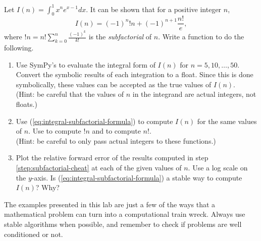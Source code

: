 \begin{problem}
Let $I(n) = \int_0^1 x^n e^{x - 1} dx$.
It can be shown that for a positive integer $n$,
\begin{equation}
I(n) = \left(-1\right)^{n} !n + \left(-1\right)^{n + 1} \frac{n!}{e},
\label{eq:integral-subfactorial-formula}
\end{equation}
where $!n=n!\sum_{k=0}^{n} \frac{(-1)^k}{k!}$ is the \emph{subfactorial} of $n$.
Write a function to do the following.
\begin{enumerate}
\item Use SymPy's  to evaluate the integral form of $I(n)$ for $n=5,10,\ldots,50$.
Convert the symbolic results of each integration to a float.
Since this is done symbolically, these values can be accepted as the true values of $I(n)$.
\\(Hint: be careful that the values of $n$ in the integrand are actual integers, not floats.)

\item Use (\ref{eq:integral-subfactorial-formula}) to compute $I(n)$ for the same values of $n$.
Use  to compute $!n$ and  to compute $n!$.
\\(Hint: be careful to only pass actual integers to these functions.)
\label{step:subfactorial-cheat}

\item Plot the relative forward error of the results computed in step \ref{step:subfactorial-cheat} at each of the given values of $n$.
Use a log scale on the $y$-axis.
Is (\ref{eq:integral-subfactorial-formula}) a stable way to compute $I(n)$?
Why?
\end{enumerate}
\end{problem}

The examples presented in this lab are just a few of the ways that a mathematical problem can turn into a computational train wreck.
Always use stable algorithms when possible, and remember to check if problems are well conditioned or not.

